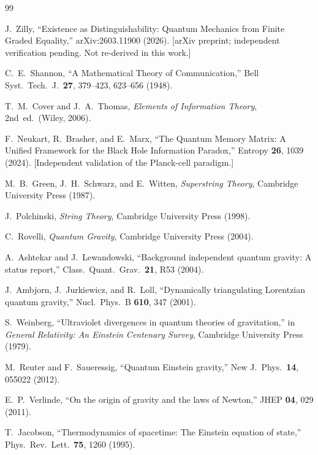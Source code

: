 \documentclass[aps,prd,twocolumn,showpacs,superscriptaddress,preprintnumbers]{revtex4-2}
\begin{document}

\begin{thebibliography}{99}

J.~Zilly, ``Existence as Distinguishability: Quantum Mechanics from Finite Graded Equality,''
arXiv:2603.11900 (2026).
[arXiv preprint; independent verification pending. Not re-derived in this work.]

C.~E.~Shannon, ``A Mathematical Theory of Communication,''
Bell Syst.~Tech.~J.~\textbf{27}, 379--423, 623--656 (1948).

T.~M.~Cover and J.~A.~Thomas, \emph{Elements of Information Theory}, 2nd~ed.\ (Wiley, 2006).

F.~Neukart, R.~Brasher, and E.~Marx,
``The Quantum Memory Matrix: A Unified Framework for the Black Hole Information Paradox,''
Entropy \textbf{26}, 1039 (2024).
[Independent validation of the Planck-cell paradigm.]

M.~B.~Green, J.~H.~Schwarz, and E.~Witten,
\textit{Superstring Theory},
Cambridge University Press (1987).

J.~Polchinski,
\textit{String Theory},
Cambridge University Press (1998).

C.~Rovelli,
\textit{Quantum Gravity},
Cambridge University Press (2004).

A.~Ashtekar and J.~Lewandowski,
``Background independent quantum gravity: A status report,''
Class.\ Quant.\ Grav.\ \textbf{21}, R53 (2004).

J.~Ambjorn, J.~Jurkiewicz, and R.~Loll,
``Dynamically triangulating Lorentzian quantum gravity,''
Nucl.\ Phys.\ B \textbf{610}, 347 (2001).

S.~Weinberg,
``Ultraviolet divergences in quantum theories of gravitation,''
in \textit{General Relativity: An Einstein Centenary Survey},
Cambridge University Press (1979).

M.~Reuter and F.~Saueressig,
``Quantum Einstein gravity,''
New J.\ Phys.\ \textbf{14}, 055022 (2012).

E.~P.~Verlinde,
``On the origin of gravity and the laws of Newton,''
JHEP \textbf{04}, 029 (2011).

T.~Jacobson,
``Thermodynamics of spacetime: The Einstein equation of state,''
Phys.\ Rev.\ Lett.\ \textbf{75}, 1260 (1995).


\end{thebibliography}
\end{document}
